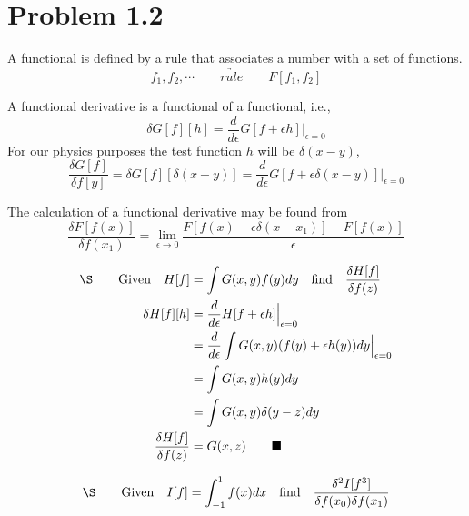 \documentclass{amsart}
\begin{document}
\section*{Problem 1.2}

A functional is defined by a rule that associates a number with a set of functions.
\[f_1, f_2, \cdots\qquad\underrightarrow{rule}\qquad F[f_1, f_2] \]

A functional derivative is a functional of a functional, i.e.,
\[\delta G[f][h]=\frac{d}{d\epsilon}G[f+\epsilon h]\Big\vert_{\epsilon=0}\]
For our physics purposes the test function $h$ will be $\delta(x-y)$,
\[\frac{\delta G[f]}{\delta f[y]}=\delta G[f][\delta(x-y)]=\frac{d}{d\epsilon}G[f+\epsilon\delta(x-y)]\Big\vert_{\epsilon=0}\]

The calculation of a functional derivative may be found from
\[\frac{\delta F[f(x)]}{\delta f(x_1)}=\lim_{\epsilon\to 0}\frac{F[f(x)-\epsilon\delta(x-x_1)]-F[f(x)]}{\epsilon}    \]


\begin{align*}
    \qq*{\S}\qq{Given}H[f]          & =\int G(x,y)f(y)dy\qq{find}\frac{\delta H[f]}{\delta f(z)}                  \\
    \delta H[f][h]                  & =\frac{d}{d\epsilon}H[f+\epsilon h]\Big\vert_{\epsilon=0}                   \\
                                    & =\frac{d}{d\epsilon}\int G(x,y)(f(y)+\epsilon h(y))dy\Big\vert_{\epsilon=0} \\
                                    & =\int G(x,y)h(y)dy                                                          \\
                                    & =\int G(x,y)\delta(y-z)dy                                                   \\
    \frac{\delta H[f]}{\delta f(z)} & =G(x,z) \qquad \blacksquare
\end{align*}


\begin{align*}
    \qq*{\S}\qq{Given}I[f] & =\int_{-1}^{1} f(x)dx\qq{find}\frac{\delta^2 I[f^3]}{\delta f(x_0)\delta f(x_1)} \\
\end{align*}
\end{document}
